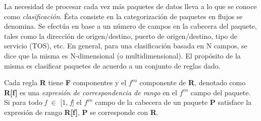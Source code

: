 La necesidad de procesar cada vez más paquetes de datos lleva a lo que se conoce como \textit{clasificación}. Ésta consiste en la categorización de paquetes en flujos se denomina. Se efectúa en base a un número de campos en la cabecera del paquete, tales como la dirección de origen/destino, puerto de origen/destino, tipo de servicio (TOS), etc. En general, para una clasificación basada en N campos, se dice que la misma es N-dimensional (o multidimensional). El propósito de la misma es clasificar paquetes de acuerdo a un conjunto de reglas dado.

Cada regla \textbf{R} tiene \textbf{F} componentes y el $ f^{vo} $ componente de \textbf{R}, denotado como \textbf{R[f]} es una \textit{expresión de correspondencia de rango} en el $ f^{vo} $ campo del paquete. Si para todo \textit{f} $ \in $ [1, \textit{f}] el $ f^{vo} $ campo de la cabecera de un paquete \textbf{P} satisface la expresión de rango \textbf{R[f]}, \textbf{P} se corresponde con \textbf{R}.

